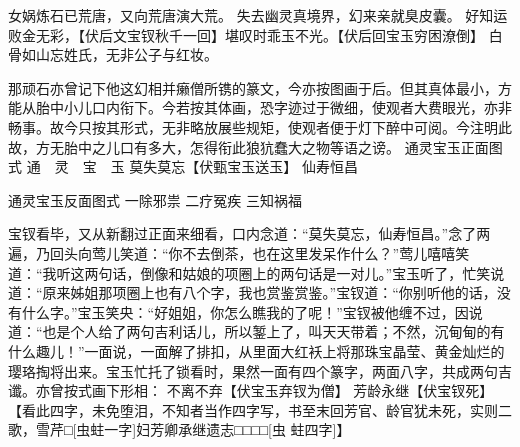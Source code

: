 \documentclass[12pt,oneside]{book}
\begin{document}
女娲炼石已荒唐，又向荒唐演大荒。
失去幽灵真境界，幻来亲就臭皮囊。
好知运败金无彩，【伏后文宝钗秋千一回】堪叹时乖玉不光。【伏后回宝玉穷困潦倒】
白骨如山忘姓氏，无非公子与红妆。

那顽石亦曾记下他这幻相并癞僧所镌的篆文，今亦按图画于后。但其真体最小，方能从胎中小儿口内衔下。今若按其体画，恐字迹过于微细，使观者大费眼光，亦非畅事。故今只按其形式，无非略放展些规矩，使观者便于灯下醉中可阅。今注明此故，方无胎中之儿口有多大，怎得衔此狼犺蠢大之物等语之谤。
通灵宝玉正面图式  通　灵　宝　玉  莫失莫忘【伏甄宝玉送玉】  仙寿恒昌

通灵宝玉反面图式  一除邪祟  二疗冤疾  三知祸福
 

宝钗看毕，又从新翻过正面来细看，口内念道：“莫失莫忘，仙寿恒昌。”念了两遍，乃回头向莺儿笑道：“你不去倒茶，也在这里发呆作什么？”莺儿嘻嘻笑道：“我听这两句话，倒像和姑娘的项圈上的两句话是一对儿。”宝玉听了，忙笑说道：“原来姊姐那项圈上也有八个字，我也赏鉴赏鉴。”宝钗道：“你别听他的话，没有什么字。”宝玉笑央：“好姐姐，你怎么瞧我的了呢！”宝钗被他缠不过，因说道：“也是个人给了两句吉利话儿，所以錾上了，叫天天带着；不然，沉甸甸的有什么趣儿！”一面说，一面解了排扣，从里面大红袄上将那珠宝晶莹、黄金灿烂的璎珞掏将出来。宝玉忙托了锁看时，果然一面有四个篆字，两面八字，共成两句吉谶。亦曾按式画下形相：
不离不弃【伏宝玉弃钗为僧】  芳龄永继【伏宝钗死】【看此四字，未免堕泪，不知者当作四字写，书至末回芳官、龄官犹未死，实则二歌，雪芹□[虫蛀一字]妇芳卿承继遗志□□□□[虫
蛀四字]】
\end{document}
